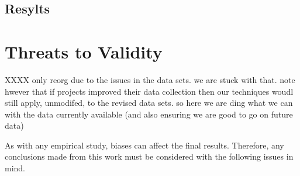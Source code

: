 \documentclass{sig-alternate}
\newcommand{\fig}[1]{Figure~\ref{fig:#1}}
\begin{document}
\begin{itemize}
\subsection{Resylts}

 
\section{Threats to Validity}\label{sect:valid}

XXXX only reorg due to the issues in the data sets.
we are stuck with that. note hwever that if
projects improved their data collection then
our techniques woudl still apply, unmodifed, to the revised data sets. so here we are ding what we can with the data currently available (and also ensuring we are good to go on future data)


As with any empirical study, biases can affect the final results. Therefore, any
conclusions made from this work must be considered with the following issues in
mind.

 


\end{itemize}
\end{document}
